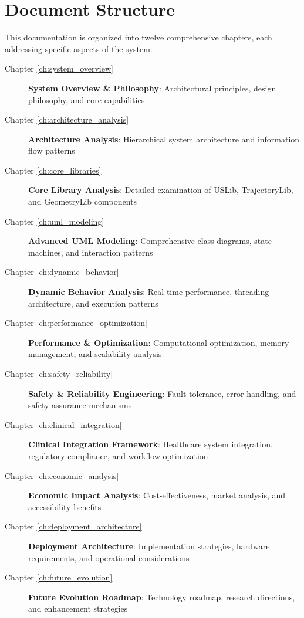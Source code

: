 \section{Document Structure}
\label{sec:document_structure}

This documentation is organized into twelve comprehensive chapters, each addressing specific aspects of the \rus{} system:

\begin{description}
    \item[Chapter \ref{ch:system_overview}] \textbf{System Overview \& Philosophy}: Architectural principles, design philosophy, and core capabilities
    
    \item[Chapter \ref{ch:architecture_analysis}] \textbf{Architecture Analysis}: Hierarchical system architecture and information flow patterns
    
    \item[Chapter \ref{ch:core_libraries}] \textbf{Core Library Analysis}: Detailed examination of USLib, TrajectoryLib, and GeometryLib components
    
    \item[Chapter \ref{ch:uml_modeling}] \textbf{Advanced UML Modeling}: Comprehensive class diagrams, state machines, and interaction patterns
    
    \item[Chapter \ref{ch:dynamic_behavior}] \textbf{Dynamic Behavior Analysis}: Real-time performance, threading architecture, and execution patterns
    
    \item[Chapter \ref{ch:performance_optimization}] \textbf{Performance \& Optimization}: Computational optimization, memory management, and scalability analysis
    
    \item[Chapter \ref{ch:safety_reliability}] \textbf{Safety \& Reliability Engineering}: Fault tolerance, error handling, and safety assurance mechanisms
    
    \item[Chapter \ref{ch:clinical_integration}] \textbf{Clinical Integration Framework}: Healthcare system integration, regulatory compliance, and workflow optimization
    
    \item[Chapter \ref{ch:economic_analysis}] \textbf{Economic Impact Analysis}: Cost-effectiveness, market analysis, and accessibility benefits
    
    \item[Chapter \ref{ch:deployment_architecture}] \textbf{Deployment Architecture}: Implementation strategies, hardware requirements, and operational considerations
    
    \item[Chapter \ref{ch:future_evolution}] \textbf{Future Evolution Roadmap}: Technology roadmap, research directions, and enhancement strategies
\end{description}

